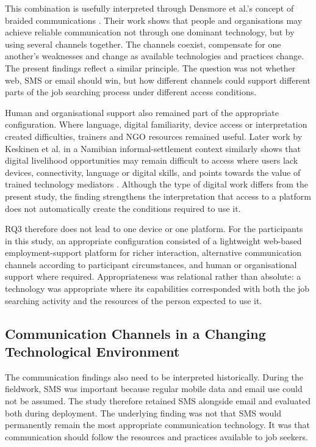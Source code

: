 This combination is usefully interpreted through Densmore et al.'s concept of braided communications \cite{densmore2013}. Their work shows that people and organisations may achieve reliable communication not through one dominant technology, but by using several channels together. The channels coexist, compensate for one another's weaknesses and change as available technologies and practices change. The present findings reflect a similar principle. The question was not whether web, SMS or email should win, but how different channels could support different parts of the job searching process under different access conditions.

Human and organisational support also remained part of the appropriate configuration. Where language, digital familiarity, device access or interpretation created difficulties, trainers and NGO resources remained useful. Later work by Keskinen et al. in a Namibian informal-settlement context similarly shows that digital livelihood opportunities may remain difficult to access where users lack devices, connectivity, language or digital skills, and points towards the value of trained technology mediators \cite{keskinen2022}. Although the type of digital work differs from the present study, the finding strengthens the interpretation that access to a platform does not automatically create the conditions required to use it.

RQ3 therefore does not lead to one device or one platform. For the participants in this study, an appropriate configuration consisted of a lightweight web-based employment-support platform for richer interaction, alternative communication channels according to participant circumstances, and human or organisational support where required. Appropriateness was relational rather than absolute: a technology was appropriate where its capabilities corresponded with both the job searching activity and the resources of the person expected to use it.


\subsection{Communication Channels in a Changing Technological Environment}

The communication findings also need to be interpreted historically. During the fieldwork, SMS was important because regular mobile data and email use could not be assumed. The study therefore retained SMS alongside email and evaluated both during deployment. The underlying finding was not that SMS would permanently remain the most appropriate communication technology. It was that communication should follow the resources and practices available to job seekers.


